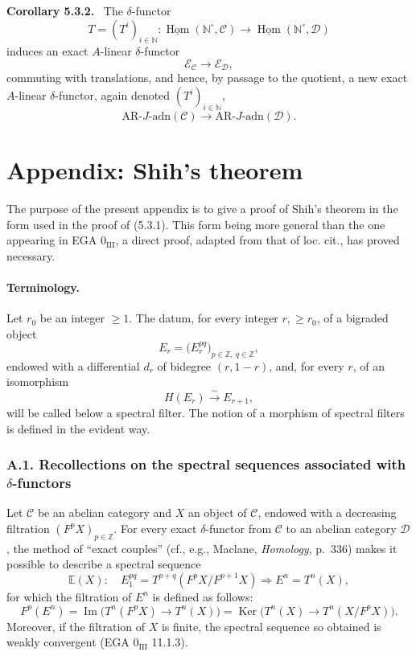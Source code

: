 \documentclass[11pt]{article}
\providecommand{\uHom}{\underline{\Hom}}
\newenvironment{statement}[1]{\par\medskip\noindent\textbf{#1.}\ }{\par\medskip}
\DeclareMathOperator{\Hom}{Hom}
\providecommand{\Ker}{\operatorname{Ker}}
\providecommand{\Hom}{\operatorname{Hom}}
\providecommand{\Im}{\operatorname{Im}}
\providecommand{\Ker}{\operatorname{Ker}}
\renewcommand{\Im}{\operatorname{Im}}
\providecommand{\Ker}{\operatorname{Ker}}
\providecommand{\Im}{\operatorname{Im}}
\providecommand{\Hom}{\operatorname{Hom}}
\begin{document}
\begin{statement}{Corollary 5.3.2}
The \(\delta\)-functor
\[
T=(T^i)_{i\in\mathbb N}:\uHom(\mathbb N^\circ,\mathcal C)\longrightarrow\uHom(\mathbb N^\circ,\mathcal D)
\]
induces an exact \(A\)-linear \(\delta\)-functor
\[
\mathcal E_{\mathcal C}\longrightarrow\mathcal E_{\mathcal D},
\]
commuting with translations, and hence, by passage to the quotient, a new exact \(A\)-linear \(\delta\)-functor, again denoted \((T^i)_{i\in\mathbb N}\),
\[
\mathrm{AR}\text{-}J\text{-adn}(\mathcal C)\longrightarrow
\mathrm{AR}\text{-}J\text{-adn}(\mathcal D).
\]
\end{statement}

\section*{Appendix: Shih's theorem}

The purpose of the present appendix is to give a proof of Shih's theorem in the form used in the proof of (5.3.1). This form being more general than the one appearing in EGA \(0_{\mathrm{III}}\), a direct proof, adapted from that of loc. cit., has proved necessary.

\paragraph{Terminology.}
Let \(r_0\) be an integer \(\ge1\). The datum, for every integer \(r,\ge r_0\), of a bigraded object
\[
E_r=\bigl(E_r^{pq}\bigr)_{p\in\mathbb Z,\ q\in\mathbb Z},
\]
endowed with a differential \(d_r\) of bidegree \((r,1-r)\), and, for every \(r\), of an isomorphism
\[
H(E_r)\xrightarrow{\sim}E_{r+1},
\]
will be called below a spectral filter. The notion of a morphism of spectral filters is defined in the evident way.

\subsubsection*{A.1. Recollections on the spectral sequences associated with \(\delta\)-functors}

Let \(\mathcal C\) be an abelian category and \(X\) an object of \(\mathcal C\), endowed with a decreasing filtration \((F^pX)_{p\in\mathbb Z}\). For every exact \(\delta\)-functor from \(\mathcal C\) to an abelian category \(\mathcal D\), the method of “exact couples” (cf., e.g., Maclane, \emph{Homology}, p.~336) makes it possible to describe a spectral sequence
\[
\mathbb{E}(X):\quad E_1^{pq}=T^{p+q}(F^pX/F^{p+1}X)\Rightarrow E^n=T^n(X),
\]
for which the filtration of \(E^n\) is defined as follows:
\[
F^p(E^n)=\Im\bigl(T^n(F^pX)\longrightarrow T^n(X)\bigr)
=\Ker\bigl(T^n(X)\longrightarrow T^n(X/F^pX)\bigr).
\]
Moreover, if the filtration of \(X\) is finite, the spectral sequence so obtained is weakly convergent (EGA \(0_{\mathrm{III}}\) 11.1.3).
\end{document}
